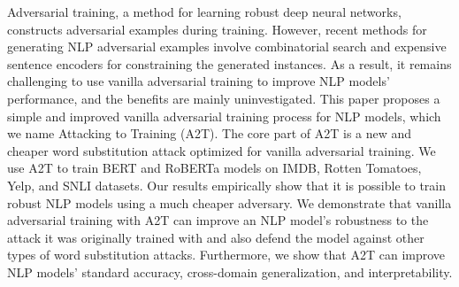 Adversarial training, a method for learning robust deep neural networks, constructs adversarial examples during training. However, recent methods for generating NLP adversarial examples involve combinatorial search and expensive sentence encoders for constraining the generated instances. As a result, it remains challenging to use vanilla adversarial training to improve NLP models' performance, and the benefits are mainly uninvestigated. This paper proposes a simple and improved vanilla adversarial training process for NLP models, which we name Attacking to Training (A2T). The core part of A2T is a new and cheaper word substitution attack optimized for vanilla adversarial training. We use A2T to train BERT and RoBERTa models on IMDB, Rotten Tomatoes, Yelp, and SNLI datasets. Our results empirically show that it is possible to train robust NLP models using a much cheaper adversary. We demonstrate that vanilla adversarial training with A2T can improve an NLP model's robustness to the attack it was originally trained with and also defend the model against other types of word substitution attacks. Furthermore, we show that A2T can improve NLP models' standard accuracy, cross-domain generalization, and interpretability.
